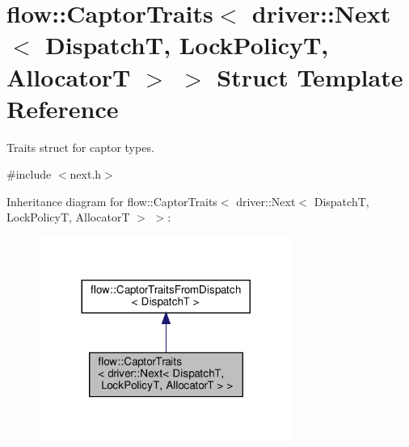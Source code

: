\hypertarget{structflow_1_1_captor_traits_3_01driver_1_1_next_3_01_dispatch_t_00_01_lock_policy_t_00_01_allocator_t_01_4_01_4}{}\section{flow\+:\+:Captor\+Traits$<$ driver\+:\+:Next$<$ DispatchT, Lock\+PolicyT, AllocatorT $>$ $>$ Struct Template Reference}
\label{structflow_1_1_captor_traits_3_01driver_1_1_next_3_01_dispatch_t_00_01_lock_policy_t_00_01_allocator_t_01_4_01_4}


Traits struct for captor types.  




{\ttfamily \#include $<$next.\+h$>$}



Inheritance diagram for flow\+:\+:Captor\+Traits$<$ driver\+:\+:Next$<$ DispatchT, Lock\+PolicyT, AllocatorT $>$ $>$\+:\nopagebreak
\begin{figure}[H]
\begin{center}
\leavevmode
\includegraphics[width=236pt]{structflow_1_1_captor_traits_3_01driver_1_1_next_3_01_dispatch_t_00_01_lock_policy_t_00_01_alloc7714098de8c8180ba25813bb8e62a4a9}
\end{center}
\end{figure}


